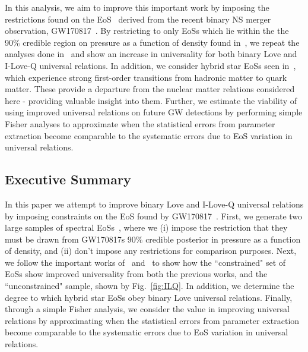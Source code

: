 \documentclass[prd,twocolumn,nofootinbib,superscriptaddress,amsmath,amssymb]{revtex4-1}
\begin{document}
In this analysis, we aim to improve this important work by imposing the restrictions found on the EoS~\cite{LIGO:posterior} derived from the recent binary NS merger observation, GW170817~\cite{TheLIGOScientific:2017qsa}.
By restricting to only EoSs which lie within the the 90\% credible region on pressure as a function of density found in~\cite{LIGO:posterior}, we repeat the analyses done in~\cite{Yagi:binLove,Yagi:ILQ} and show an increase in universality for both binary Love and I-Love-Q universal relations.
In addition, we consider hybrid star EoSs seen in~\cite{Paschalidis2018}, which experience strong first-order transitions from hadronic matter to quark matter.
These provide a departure from the nuclear matter relations considered here - providing valuable insight into them.
Further, we estimate the viability of using improved universal relations on future GW detections by performing simple Fisher analyses to approximate when the statistical errors from parameter extraction become comparable to the systematic errors due to EoS variation in universal relations.

\subsection{Executive Summary}
In this paper we attempt to improve binary Love and I-Love-Q universal relations by imposing constraints on the EoS found by GW170817~\cite{LIGO:posterior,TheLIGOScientific:2017qsa}.
First, we generate two large samples of spectral EoSs~\cite{Lindblom:2018rfr}, where we (i) impose the restriction that they must be drawn from GW170817s 90\% credible posterior in pressure as a function of density, and (ii) don't impose any restrictions for comparison purposes.
Next, we follow the important works of~\cite{Yagi:binLove} and~\cite{Yagi:ILQ} to show how the ``constrained" set of EoSs show improved universality from both the previous works, and the ``unconstrained" sample, shown by Fig.~\ref{fig:ILQ}.
In addition, we determine the degree to which hybrid star EoSs obey binary Love universal relations.
Finally, through a simple Fisher analysis, we consider the value in improving universal relations by approximating when the statistical errors from parameter extraction become comparable to the systematic errors due to EoS variation in universal relations.
\end{document}
